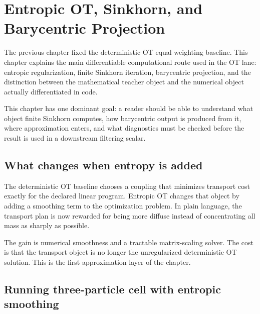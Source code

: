 \chapter{Entropic OT, Sinkhorn, and Barycentric Projection}
\label{ch:bf-dpf-entropic-ot-sinkhorn}

The previous chapter fixed the deterministic OT equal-weighting baseline.  This
chapter explains the main differentiable computational route used in the OT lane:
entropic regularization, finite Sinkhorn iteration, barycentric projection, and
the distinction between the mathematical teacher object and the numerical object
actually differentiated in code.

This chapter has one dominant goal: a reader should be able to understand what
object finite Sinkhorn computes, how barycentric output is produced from it, where
approximation enters, and what diagnostics must be checked before the result is
used in a downstream filtering scalar.

\section{What changes when entropy is added}
\label{sec:bf-eot-what-changes}

The deterministic OT baseline chooses a coupling that minimizes transport cost
exactly for the declared linear program.  Entropic OT changes that object by
adding a smoothing term to the optimization problem.  In plain language, the
transport plan is now rewarded for being more diffuse instead of concentrating all
mass as sharply as possible.

The gain is numerical smoothness and a tractable matrix-scaling solver.  The cost
is that the transport object is no longer the unregularized deterministic OT
solution.  This is the first approximation layer of the chapter.

\section{Running three-particle cell with entropic smoothing}
\label{sec:bf-eot-running-cell}

